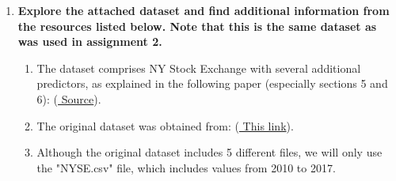 \documentclass[12pt]{article}
\begin{document}
\begin{enumerate}

\item \textbf{Explore the attached dataset and find additional information from the resources listed below.  Note that this is the same dataset as was used in assignment 2.}
\begin{enumerate}
\item The dataset comprises NY Stock Exchange with several additional predictors, as explained in the following paper (especially sections 5 and 6):  (\href{https://www.sciencedirect.com/science/article/abs/pii/S0957417419301915}{ Source}).
\item The original dataset was obtained from: (\href{https://archive.ics.uci.edu/ml/datasets/CNNpred\%3A+CNN-based+stock+market+prediction+using+a+diverse+set+of+variablesc}{ This link}).
\item Although the original dataset includes 5 different files, we will only use the "NYSE.csv" file, which includes values from 2010 to 2017.
\end{enumerate}



\newpage

\newpage

%
%









\end{enumerate}
\end{document}
